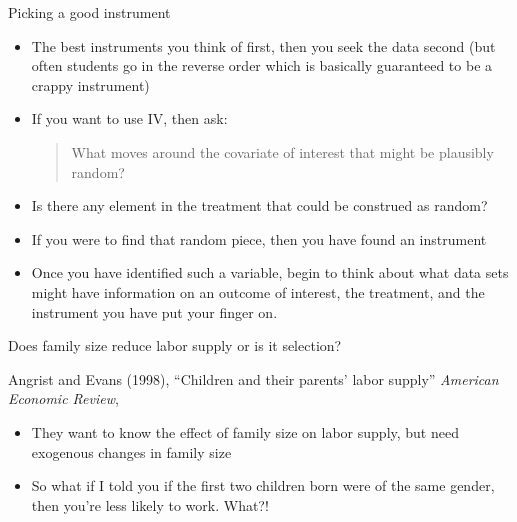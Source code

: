 \documentclass{beamer}
\begin{document}
\begin{frame}{Picking a good instrument}

  \begin{itemize}
    \item The best instruments you think of first, then you seek the data second (but often students go in the reverse order which is basically guaranteed to be a crappy instrument)
    \item If you want to use IV, then ask:
          \begin{quote}
            What moves around the covariate of interest that might be plausibly random?
          \end{quote}
    \item Is there any element in the treatment that could be construed as random?
    \item If you were to find that random piece, then you have found an instrument
    \item Once you have identified such a variable, begin to think about what data sets might have information on an outcome of interest, the treatment, and the instrument you have put your finger on.
  \end{itemize}
\end{frame}



\begin{frame}{Does family size reduce labor supply or is it selection?}

  Angrist and Evans (1998), ``Children and their parents' labor supply'' \emph{American Economic Review},
  \begin{itemize}
    \item They want to know the effect of family size on labor supply, but need exogenous changes in family size
    \item So what if I told you if the first two children born were of the same gender, then you're less likely to work. What?!
  \end{itemize}

\end{frame}
\end{document}
